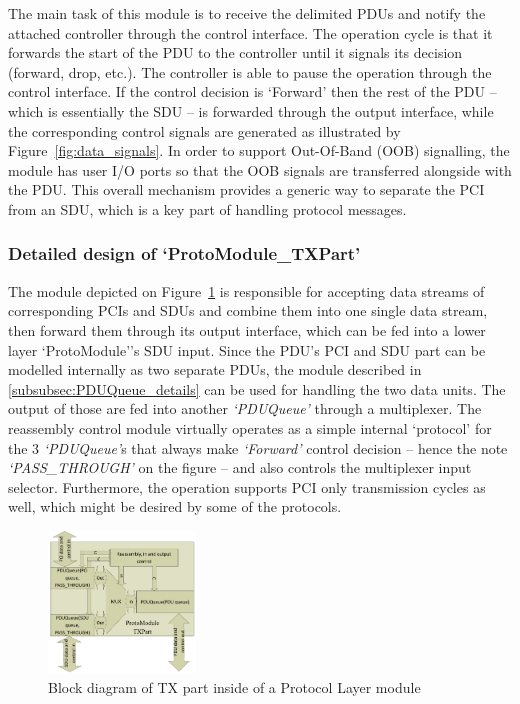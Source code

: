 \documentclass[conference]{IEEEtran}
\begin{document}
The main task of this module is to receive the delimited PDUs and notify the attached controller through the control
interface. The operation cycle is that it forwards the start of the PDU to the controller until it signals its decision
(forward, drop, etc.). The controller is able to pause the operation through the control interface. If the control
decision is `Forward' then the rest of the PDU -- which is essentially the SDU -- is forwarded through the output
interface, while the corresponding control signals are generated as illustrated by Figure~\ref{fig:data_signals}. In
order to support Out-Of-Band (OOB) signalling, the module has user I/O ports so that the OOB signals are transferred
alongside with the PDU. This overall mechanism provides a generic way to separate the PCI from an SDU, which is a key
part of handling protocol messages.

\subsubsection{Detailed design of `ProtoModule\_TXPart'}

The module depicted on Figure~\ref{fig:proto_layer_tx_sch} is responsible for accepting data streams of corresponding
PCIs and SDUs and combine them into one single data stream, then forward them through its output interface, which can
be fed into a lower layer `ProtoModule''s SDU input. Since the PDU's PCI and SDU part can be modelled internally as two
separate PDUs, the module described in \ref{subsubsec:PDUQueue_details} can be used for handling the two data units.
The output of those are fed into another \emph{`PDUQueue'} through a multiplexer. The reassembly control module
virtually operates as a simple internal `protocol' for the 3 \emph{`PDUQueue'}s that always make \emph{`Forward'}
control decision -- hence the note \emph{`PASS\_THROUGH'} on the figure -- and also controls the multiplexer input
selector. Furthermore, the operation supports PCI only transmission cycles as well, which might be desired by some of
the protocols.
\begin{figure}[!htb]
    \centering
    \includegraphics[width=0.35\textwidth]{figures_raw/proto_tx_part_imp.pdf}
    \caption{Block diagram of TX part inside of a Protocol Layer module}
    \label{fig:proto_layer_tx_sch}
\end{figure}
\end{document}
